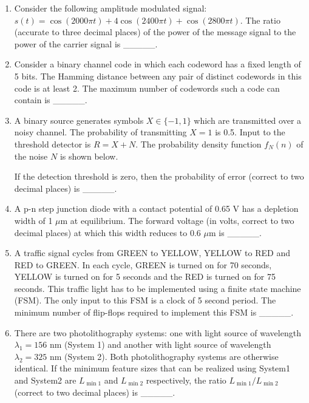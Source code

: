\documentclass{article}
\begin{document}
\begin{enumerate}
\item Consider the following amplitude modulated signal:
$s(t) = \cos(2000 \pi t) + 4 \cos(2400 \pi t) + \cos(2800 \pi t)$.
The ratio (accurate to three decimal places) of the power of the message signal to the power of the carrier signal is \_\_\_\_\_.

\item Consider a binary channel code in which each codeword has a fixed length of 5 bits. The Hamming distance between any pair of distinct codewords in this code is at least 2. The maximum number of codewords such a code can contain is \_\_\_\_\_.

\item A binary source generates symbols $X \in \{-1,1\}$ which are transmitted over a noisy channel. The probability of transmitting $X = 1$ is 0.5. Input to the threshold detector is $R = X + N$. The probability density function $f_N(n)$ of the noise $N$ is shown below.
\begin{figure}[H]
    \centering
    
    \caption{}
    \label{fig:q27}
\end{figure}
If the detection threshold is zero, then the probability of error (correct to two decimal places) is \_\_\_\_\_.

\item A p-n step junction diode with a contact potential of 0.65 V has a depletion width of 1 $\mu$m at equilibrium. The forward voltage (in volts, correct to two decimal places) at which this width reduces to 0.6 $\mu$m is \_\_\_\_\_.

\item A traffic signal cycles from GREEN to YELLOW, YELLOW to RED and RED to GREEN. In each cycle, GREEN is turned on for 70 seconds, YELLOW is turned on for 5 seconds and the RED is turned on for 75 seconds. This traffic light has to be implemented using a finite state machine (FSM). The only input to this FSM is a clock of 5 second period. The minimum number of flip-flops required to implement this FSM is \_\_\_\_\_.

\item There are two photolithography systems: one with light source of wavelength $\lambda_1 = 156$ nm (System 1) and another with light source of wavelength $\lambda_2 = 325$ nm (System 2). Both photolithography systems are otherwise identical. If the minimum feature sizes that can be realized using System1 and System2 are $L_{\min1}$ and $L_{\min2}$ respectively, the ratio $L_{\min1}/L_{\min2}$ (correct to two decimal places) is \_\_\_\_\_.


\end{enumerate}
\end{document}
